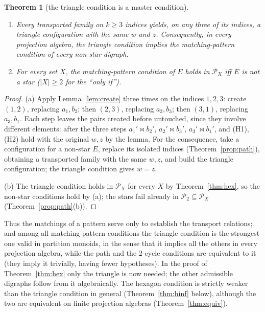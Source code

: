 \documentclass[11pt]{amsart}
\newtheorem{theorem}{Theorem}[section]
\theoremstyle{definition}
\renewcommand{\P}{\mathcal{P}}
\newcommand{\mt}{\bowtie}   %
\begin{document}
\begin{theorem}[the triangle condition is a master condition]\label{thm:master}
\begin{enumerate}[label=\textup{(\alph*)}]
\item Every transported family on $k\ge3$ indices yields, on any three of its indices, a triangle configuration with the same $w$ and $z$. Consequently, in \emph{every} projection algebra, the triangle condition implies the matching-pattern condition of every non-star digraph.
\item For every set $X$, the matching-pattern condition of $E$ holds in $\P_X$ iff $E$ is not a star ($|X|\ge2$ for the ``only if'').
\end{enumerate}
\end{theorem}
\begin{proof}
(a) Apply Lemma~\ref{lem:create} three times on the indices $1,2,3$: create $(1,2)$, replacing $a_1,b_2$; then $(2,3)$, replacing $a_2,b_3$; then $(3,1)$, replacing $a_3,b_1$. Each step leaves the pairs created before untouched, since they involve different elements: after the three steps $a_1'\mt b_2'$, $a_2'\mt b_3'$, $a_3'\mt b_1'$, and (H1), (H2) hold with the original $w,z$ by the lemma. For the consequence, take a configuration for a non-star $E$, replace its isolated indices (Theorem~\ref{prop:path}), obtaining a transported family with the same $w,z$, and build the triangle configuration; the triangle condition gives $w=z$.

(b) The triangle condition holds in $\P_X$ for every $X$ by Theorem~\ref{thm:hex}, so the non-star conditions hold by (a); the stars fail already in $\P_2\subseteq\P_X$ (Theorem~\ref{prop:path}(b)).
\end{proof}

Thus the matchings of a pattern serve only to establish the transport relations; and among all matching-pattern conditions the triangle condition is the strongest one valid in partition monoids, in the sense that it implies all the others in every projection algebra, while the path and the $2$-cycle conditions are equivalent to it (they imply it trivially, having fewer hypotheses). In the proof of Theorem~\ref{thm:hex} only the triangle is now needed; the other admissible digraphs follow from it algebraically. The hexagon condition is strictly weaker than the triangle condition in general (Theorem~\ref{thm:hinf} below), although the two are equivalent on finite projection algebras (Theorem~\ref{thm:equiv}).
\end{document}
